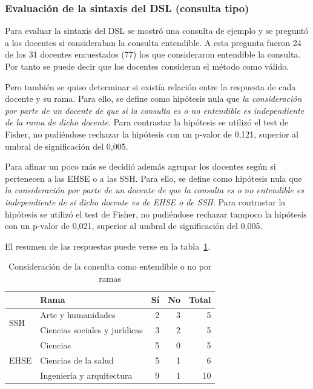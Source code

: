 \subsubsection*{Evaluación de la sintaxis del DSL (consulta tipo)}

Para evaluar la sintaxis del DSL se mostró una consulta de ejemplo y se preguntó a los docentes si consideraban la consulta entendible. A esta pregunta fueron 24 de los 31 docentes encuestados (77\percentage) los que consideraron entendible la consulta. Por tanto se puede decir que los docentes consideran el método como válido.

Pero también se quiso determinar si existía relación entre la respuesta de cada docente y su rama. Para ello, se define como hipótesis nula que \emph{la consideración por parte de un docente de que si la consulta es o no entendible es independiente de la rama de dicho docente}. Para contrastar la hipótesis se utilizó el test de Fisher, no pudiéndose rechazar la hipótesis con un p-valor de 0,121, superior al umbral de significación del 0,005.

Para afinar un poco más se decidió además agrupar los docentes según si pertenecen a las EHSE o a  las SSH. Para ello, se define como hipótesis nula que \emph{la consideración por parte de un docente de que la consulta es o no entendible es independiente de si  dicho docente es de EHSE o de SSH}. Para contrastar la hipótesis se utilizó el test de Fisher, no pudiéndose rechazar tampoco la hipótesis con un p-valor de 0,021, superior al umbral de significación del 0,005.

El resumen de las respuestas puede verse en la tabla~\ref{tab:cap:encuesta:consulta:rama}.

\begin{table}
  \begin{center}
  \begin{tabular}{| l | l | r | r | r |}
    \hline
    & Rama & Sí & No & Total \\
    \hline
    \hline
    \multirow{2}{2.5cm}{SSH} & Arte y humanidades & 2 & 3 & 5  \\
    \cline{2-5}
    & Ciencias sociales y jurídicas & 3 & 2 & 5  \\
    \hline
    \multirow{3}{2.5cm}{EHSE} & Ciencias & 5 & 0 & 5  \\
    \cline{2-5}
    & Ciencias de la salud & 5 & 1 & 6  \\
    \cline{2-5}
    & Ingeniería y arquitectura & 9 & 1 & 10 \\
    \hline
  \end{tabular}
\end{center}
\caption{Consideración de la consulta como entendible o no por ramas}
\label{tab:cap:encuesta:consulta:rama}
\end{table}

